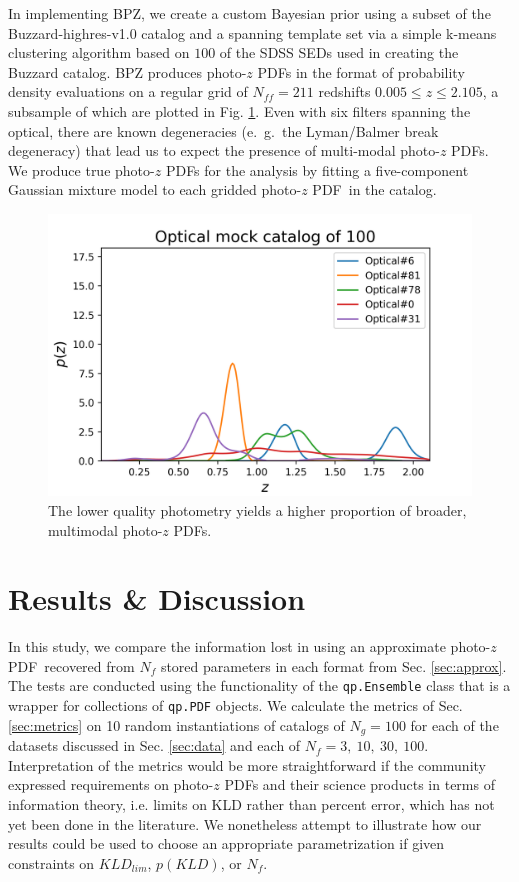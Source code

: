 \documentclass[\docopts]{\docclass}
\newcommand{\pz}{photo-$z$ PDF}
\begin{document}
In implementing BPZ, we create a custom Bayesian prior using a subset of the
Buzzard-highres-v1.0 catalog and a spanning template set via a simple k-means
clustering algorithm based on $100$ of the SDSS SEDs used in creating the
Buzzard catalog.  BPZ produces \pz s in the format of probability density
evaluations on a regular grid of $N_{ff}=211$ redshifts $0.005\leq z\leq2.105$,
a subsample of which are plotted in Fig. \ref{fig:lsst_pzs}.  Even with six
filters spanning the optical, there are known degeneracies (e.~g.~the
Lyman/Balmer break degeneracy) that lead us to expect the presence of
multi-modal \pz s.  We produce true \pz s for the analysis by fitting a
five-component Gaussian mixture model to each gridded \pz\ in the catalog.

\begin{figure}
  \includegraphics[width=0.9\columnwidth]{figures/lsst_pzs.png}
  \caption{The lower quality photometry yields a higher proportion of broader,
multimodal \pz s.
  \label{fig:lsst_pzs}}
\end{figure}


\section{Results \& Discussion}
\label{sec:results}


In this study, we compare the information lost in using an approximate \pz\
recovered from $N_{f}$ stored parameters in each format from Sec.
\ref{sec:approx}.  The tests are conducted using the functionality of the
\texttt{qp.Ensemble} class that is a wrapper for collections of \texttt{qp.PDF}
objects.  We calculate the metrics of Sec. \ref{sec:metrics} on 10 random
instantiations of catalogs of $N_{g}=100$ for each of the datasets discussed in
Sec. \ref{sec:data} and each of $N_{f}=3,\ 10,\ 30,\ 100$.  Interpretation of
the metrics would be more straightforward if the community expressed
requirements on \pz s and their science products in terms of information
theory, i.e. limits on KLD rather than percent error, which has not yet been
done in the literature.  We nonetheless attempt to illustrate how our results
could be used to choose an appropriate parametrization if given constraints on
$KLD_{lim}$, $p(KLD)$, or $N_{f}$.
\end{document}
